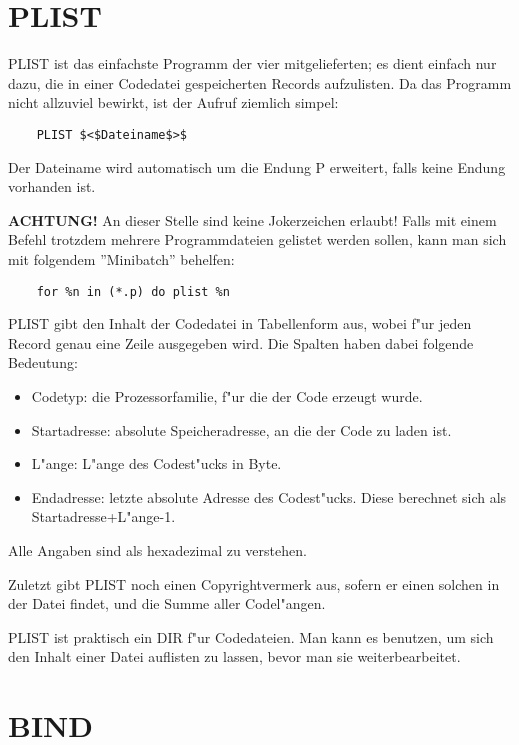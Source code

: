 \documentclass[12pt,a4paper,twoside]{report}
\newcommand{\bb}[1]{{\bf #1}}
\begin{document}
{%

\section{PLIST}

PLIST ist das einfachste Programm der vier mitgelieferten; es dient
einfach nur dazu, die in einer Codedatei gespeicherten Records aufzulisten.
Da das Programm nicht allzuviel bewirkt, ist der Aufruf ziemlich simpel:
\begin{verbatim}
    PLIST $<$Dateiname$>$
\end{verbatim}
Der Dateiname wird automatisch um die Endung P erweitert, falls keine
Endung vorhanden ist.
\par
\bb{ACHTUNG!}  An dieser Stelle sind keine Jokerzeichen erlaubt! Falls mit
einem Befehl trotzdem mehrere Programmdateien gelistet werden sollen,
kann man sich mit folgendem ''Minibatch'' behelfen:
\begin{verbatim}
    for %n in (*.p) do plist %n
\end{verbatim}
PLIST gibt den Inhalt der Codedatei in Tabellenform aus, wobei f"ur
jeden Record genau eine Zeile ausgegeben wird.  Die Spalten haben
dabei folgende Bedeutung:
\begin{itemize}
\item{Codetyp: die Prozessorfamilie, f"ur die der Code erzeugt wurde.}
\item{Startadresse: absolute Speicheradresse, an die der Code zu laden ist.}
\item{L"ange: L"ange des Codest"ucks in Byte.}
\item{Endadresse: letzte absolute Adresse des Codest"ucks.  Diese berechnet
      sich als Startadresse+L"ange-1.}
\end{itemize}
Alle Angaben sind als hexadezimal zu verstehen.
\par
Zuletzt gibt PLIST noch einen Copyrightvermerk aus, sofern er einen
solchen in der Datei findet, und die Summe aller Codel"angen.
\par
PLIST ist praktisch ein DIR f"ur Codedateien.  Man kann es benutzen,
um sich den Inhalt einer Datei auflisten zu lassen, bevor man sie
weiterbearbeitet.


\section{BIND}

}
\end{document}
